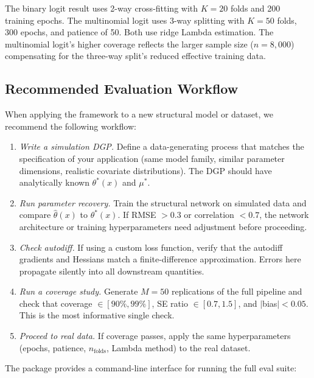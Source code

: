 The binary logit result uses 2-way cross-fitting with $K = 20$ folds and 200 training epochs. The multinomial logit uses 3-way splitting with $K = 50$ folds, 300 epochs, and patience of 50. Both use ridge Lambda estimation. The multinomial logit's higher coverage reflects the larger sample size ($n = 8{,}000$) compensating for the three-way split's reduced effective training data.

\subsection{Recommended Evaluation Workflow}\label{sec:eval_workflow}

When applying the framework to a new structural model or dataset, we recommend the following workflow:

\begin{enumerate}
    \item \emph{Write a simulation DGP.} Define a data-generating process that matches the specification of your application (same model family, similar parameter dimensions, realistic covariate distributions). The DGP should have analytically known $\theta^*(x)$ and $\mu^*$.

    \item \emph{Run parameter recovery.} Train the structural network on simulated data and compare $\hat{\theta}(x)$ to $\theta^*(x)$. If RMSE $> 0.3$ or correlation $< 0.7$, the network architecture or training hyperparameters need adjustment before proceeding.

    \item \emph{Check autodiff.} If using a custom loss function, verify that the autodiff gradients and Hessians match a finite-difference approximation. Errors here propagate silently into all downstream quantities.

    \item \emph{Run a coverage study.} Generate $M = 50$ replications of the full pipeline and check that coverage $\in [90\%, 99\%]$, SE ratio $\in [0.7, 1.5]$, and $|$bias$| < 0.05$. This is the most informative single check.

    \item \emph{Proceed to real data.} If coverage passes, apply the same hyperparameters (epochs, patience, $n_{\text{folds}}$, Lambda method) to the real dataset.
\end{enumerate}

The package provides a command-line interface for running the full eval suite:

